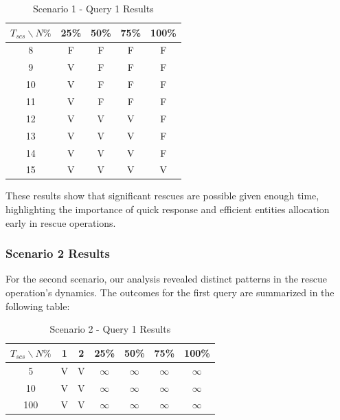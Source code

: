 \begin{table}[H]
	\centering
	\small
	\begin{tabular}{|c|c|c|c|c|}
		\hline
		$T_{scs}\backslash N\%$ & 25\% & 50\% & 75\% & 100\% \\ \hline
		8                       & F    & F    & F    & F     \\ \hline
		9                       & V    & F    & F    & F     \\ \hline
		10                      & V    & F    & F    & F     \\ \hline
		11                      & V    & F    & F    & F     \\ \hline
		12                      & V    & V    & V    & F     \\ \hline
		13                      & V    & V    & V    & F     \\ \hline
		14                      & V    & V    & V    & F     \\ \hline
		15                      & V    & V    & V    & V     \\ \hline
	\end{tabular}
	\caption{Scenario 1 - Query 1 Results}
	\label{tab:system1}
	\normalsize
\end{table}


These results show that significant rescues are possible given enough time, highlighting the importance of quick response and efficient entities allocation early in rescue operations.

\subsubsection{Scenario 2 Results}
For the second scenario, our analysis revealed distinct patterns in the rescue operation’s dynamics. The outcomes for the first query are summarized in the following table:

\begin{table}[H]
	\centering
	\small
	\begin{tabular}{|c|c|c|c|c|c|c|}
		\hline
		$T_{scs}\backslash N\%$ & 1 & 2 & 25\% & 50\% & 75\% & 100\% \\ \hline
		5                      & V & V & $\infty$ & $\infty$ & $\infty$ & $\infty$ \\ \hline
		10                     & V & V & $\infty$ & $\infty$ & $\infty$ & $\infty$ \\ \hline
		100                    & V & V & $\infty$ & $\infty$ & $\infty$ & $\infty$ \\ \hline
	\end{tabular}
	\caption{Scenario 2 - Query 1 Results}
	\label{tab:system1}
	\normalsize
\end{table}


